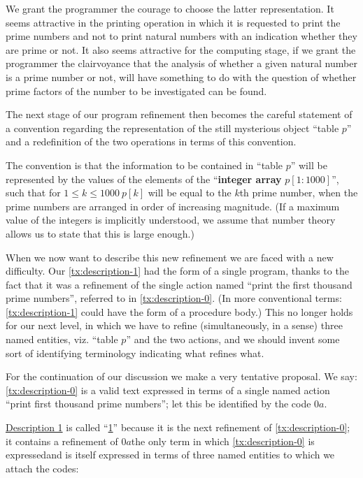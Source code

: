 We grant the programmer the courage to choose the latter representation. It seems attractive in the printing operation in which it is requested to print the prime numbers and not to print natural numbers with an indication whether they are prime or not. It also seems attractive for the computing stage, if we grant the programmer the clairvoyance that the analysis of whether a given natural number is a prime number or not, will have something to do with the question of whether prime factors of the number to be investigated can be found.

The next stage of our program refinement then becomes the careful statement of a convention regarding the representation of the still mysterious object ``table $p$'' and a redefinition of the two operations in terms of this convention.

The convention is that the information to be contained in ``table $p$'' will be represented by the values of the elements of the ``\textbf{integer array} $p[1 : 1000]$'', such that for $1 \leqslant k \leqslant 1000\ p[k]$ will be equal to the $k$th prime number, when the prime numbers are arranged in order of increasing magnitude. (If a maximum value of the integers is implicitly understood, we assume that number theory allows us to state that this is large enough.)

When we now want to describe this new refinement we are faced with a new difficulty. Our \ref{tx:description-1} had the form of a single program, thanks to the fact that it was a refinement of the single action named ``print the first thousand prime numbers'', referred to in \ref{tx:description-0}. (In more conventional terms: \ref{tx:description-1} could have the form of a procedure body.) This no longer holds for our next level, in which we have to refine (simultaneously, in a sense) three named entities, viz. ``table $p$'' and the two actions, and we should invent some sort of identifying terminology indicating what refines what.

For the continuation of our discussion we make a very tentative proposal. We say: \ref{tx:description-0} is a valid text expressed in terms of a single named action ``print first thousand prime numbers''; let this be identified by the code $0a$.

\hyperref[tx:description-1]{Description 1} is called ``\hyperref[tx:description-1]{1}'' because it is the next refinement of \ref{tx:description-0}; it contains a refinement of $0a$\textemdash{}the only term in which \ref{tx:description-0} is expressed\textemdash{}and is itself expressed in terms of three named entities to which we attach the codes:


